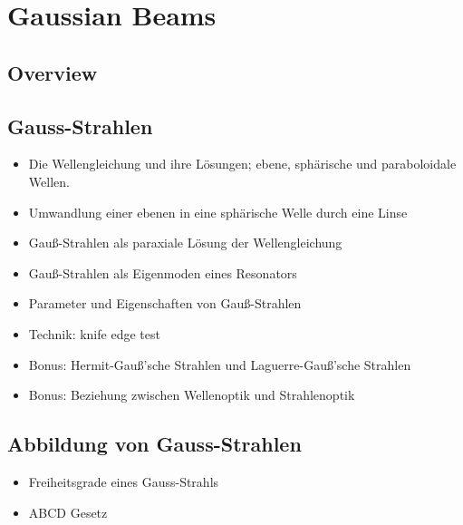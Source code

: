 \renewcommand{\lastmod}{September 18, 2023}
\renewcommand{\chapterauthors}{Markus Lippitz}

\chapter{Gaussian Beams }

\section{Overview}

\section{Gauss-Strahlen}


\begin{itemize}

\item Die Wellengleichung und ihre Lösungen;   ebene, sphärische und paraboloidale Wellen.
\item {Umwandlung einer ebenen in eine sphärische Welle durch eine Linse}
\item {Gauß-Strahlen als paraxiale Lösung der Wellengleichung}
\item {Gauß-Strahlen als Eigenmoden eines Resonators}
\item {Parameter und Eigenschaften von Gauß-Strahlen}
\item Technik: knife edge test
\item {Bonus: Hermit-Gauß’sche Strahlen und Laguerre-Gauß’sche Strahlen}
\item {Bonus: Beziehung zwischen Wellenoptik und Strahlenoptik}

\end{itemize}




\section{Abbildung von Gauss-Strahlen}


\begin{itemize}
\item {Freiheitsgrade eines Gauss-Strahls}

\item {ABCD Gesetz}
\end{itemize}





\printbibliography[segment=\therefsegment,heading=subbibliography]
